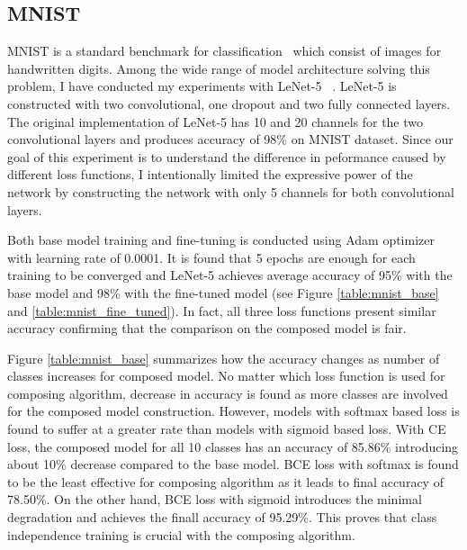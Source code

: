 \documentclass{article}
\begin{document}

\subsection{MNIST}

MNIST is a standard benchmark for classification~\cite{lecun1998gradient} which consist of images for handwritten digits. Among the wide range of model architecture solving this problem, I have conducted my experiments with LeNet-5 ~\cite{lecun2015lenet}. LeNet-5 is constructed with two convolutional, one dropout and two fully connected layers. The original implementation of LeNet-5 has 10 and 20 channels for the two convolutional layers and produces accuracy of 98\% on MNIST dataset. Since our goal of this experiment is to understand the difference in peformance caused by different loss functions, I intentionally limited the expressive power of the network by constructing the network with only 5 channels for both convolutional layers.

Both base model training and fine-tuning is conducted using Adam optimizer with learning rate of 0.0001. It is found that 5 epochs are enough for each training to be converged and LeNet-5 achieves average accuracy of 95\% with the base model and 98\% with the fine-tuned model (see Figure \ref{table:mnist_base} and \ref{table:mnist_fine_tuned}). In fact, all three loss functions present similar accuracy confirming that the comparison on the composed model is fair.

Figure \ref{table:mnist_base} summarizes how the accuracy changes as number of classes increases for composed model. No matter which loss function is used for composing algorithm, decrease in accuracy is found as more classes are involved for the composed model construction. However, models with softmax based loss is found to suffer at a greater rate than models with sigmoid based loss. With CE loss, the composed model for all 10 classes has an accuracy of 85.86\% introducing about 10\% decrease compared to the base model. BCE loss with softmax is found to be the least effective for composing algorithm as it leads to final accuracy of 78.50\%. On the other hand, BCE loss with sigmoid introduces the minimal degradation and achieves the finall accuracy of 95.29\%. This proves that class independence training is crucial with the composing algorithm.
\end{document}
